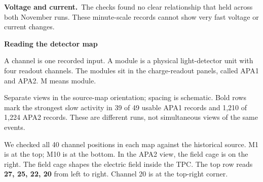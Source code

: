 \documentclass[12pt,a4paper]{article}
\newcommand{\heading}[1]{\par\vspace{6pt}{\large\bfseries #1}\par}
\newcommand{\finding}[2]{\textbf{#1}\ #2\par}
\begin{document}
\finding{Voltage and current.}{The checks found no clear relationship that held
across both November runs. These minute-scale records cannot show very fast voltage or current changes.}

\newpage
{\LARGE\bfseries Reading the detector map}\par
A channel is one recorded input. A module is a physical light-detector unit
with four readout channels. The modules sit in the charge-readout panels,
called APA1 and APA2. M means module.

\heading{Upper modules had the strongest slow activity}
\begin{center}
\end{center}
{\small Separate views in the source-map orientation; spacing is schematic. Bold rows mark the strongest
slow activity in 39 of 49 usable APA1 records and 1,210 of 1,224 APA2 records.
These are different runs, not simultaneous views of the same events.}

\heading{The channel orientation was checked}
We checked all 40 channel positions in each map against the historical source.
M1 is at the top; M10 is at the bottom. In the APA2 view, the field cage is on
the right. The field cage shapes the electric field inside the TPC. The top row reads \textbf{27, 25, 22, 20} from left to right.
Channel 20 is at the top-right corner.
\end{document}

